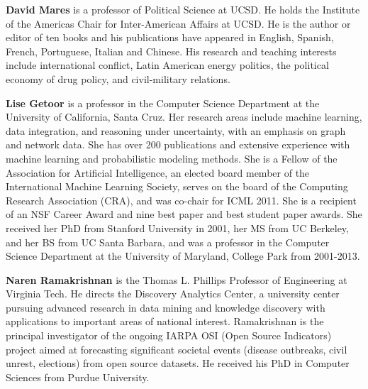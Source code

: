 \documentclass[letterpaper]{article}
\begin{document}
{\bf David Mares} is a professor of Political Science at UCSD.
He holds the Institute of the Americas Chair for Inter-American Affairs at UCSD.
He is the author or editor of ten books
and his publications have appeared in English, Spanish, French,
Portuguese, Italian and Chinese. His research and teaching interests
include international conflict, Latin American energy politics, the
political economy of drug policy, and civil-military relations.

{\bf Lise Getoor} is a professor in the Computer Science Department at the
University of California, Santa Cruz.   Her research areas include
machine learning, data integration, and reasoning under uncertainty,
with an emphasis on graph and network data. She has over 200
publications and extensive experience with machine learning and
probabilistic modeling methods.  She is a Fellow of the Association for
Artificial Intelligence, an elected board member of the International
Machine Learning Society, serves on the board of the Computing Research
Association (CRA), and was co-chair for ICML 2011.  She is a recipient
of an NSF Career Award and nine best paper and best student paper
awards.  She received her PhD from Stanford University in 2001, her MS
from UC Berkeley, and her BS from UC Santa Barbara, and was a professor
in the Computer Science Department at the University of Maryland,
College Park from 2001-2013.

{\bf Naren Ramakrishnan} is the Thomas L. Phillips Professor of Engineering at
Virginia Tech. He directs the Discovery Analytics Center, a university
center pursuing advanced research in data mining and knowledge discovery
with applications to important areas of national interest. Ramakrishnan
is the principal investigator of the ongoing IARPA OSI (Open Source
Indicators) project aimed at forecasting significant societal events
(disease outbreaks, civil unrest, elections) from open source datasets.
He received his PhD in Computer Sciences from Purdue University.
\end{document}
